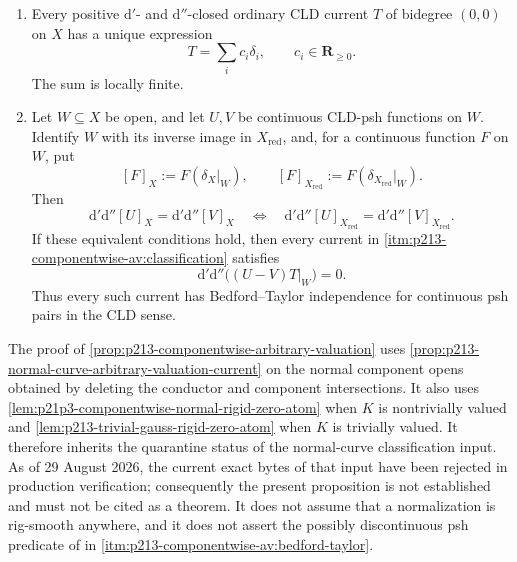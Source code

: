 \begin{proposition}
\begin{enumerate}
\item\label{itm:p213-componentwise-av:classification}
Every positive $\mathrm d'$- and $\mathrm d''$-closed ordinary CLD current
$T$ of bidegree $(0,0)$ on $X$ has a unique expression
\begin{equation}
 \label{eq:p213-componentwise-av-classification}
                         T=\sum_i c_i\delta_i,
                         \qquad c_i\in\mathbf R_{\geq0}.
\end{equation}
The sum is locally finite.

\item\label{itm:p213-componentwise-av:bedford-taylor}
Let $W\subseteq X$ be open, and let $U,V$ be continuous CLD-psh functions
on $W$.  Identify $W$ with its inverse image in $X_{\mathrm{red}}$, and,
for a continuous function $F$ on $W$, put
\[
 [F]_X:=F(\delta_X|_W),
 \qquad
 [F]_{X_{\mathrm{red}}}:=
      F(\delta_{X_{\mathrm{red}}}|_W).
\]
Then
\begin{equation}
 \label{eq:p213-componentwise-av-curvature-equivalence}
 \mathrm d'\mathrm d''[U]_X=\mathrm d'\mathrm d''[V]_X
 \quad\Longleftrightarrow\quad
 \mathrm d'\mathrm d''[U]_{X_{\mathrm{red}}}
  =\mathrm d'\mathrm d''[V]_{X_{\mathrm{red}}}.
\end{equation}
If these equivalent conditions hold, then every current in
\cref{itm:p213-componentwise-av:classification} satisfies
\begin{equation}
 \label{eq:p213-componentwise-av-bt-conclusion}
             \mathrm d'\mathrm d''\bigl((U-V)T|_W\bigr)=0.
\end{equation}
Thus every such current has Bedford--Taylor independence for continuous
psh pairs in the CLD sense.
\end{enumerate}
\end{proposition}

\begin{remark}
\label{rem:p213-componentwise-av-scope}
The proof of
\cref{prop:p213-componentwise-arbitrary-valuation} uses
\cref{prop:p213-normal-curve-arbitrary-valuation-current} on the normal
component opens obtained by deleting the conductor and component
intersections.  It also uses
\cref{lem:p21p3-componentwise-normal-rigid-zero-atom} when $K$ is
nontrivially valued and
\cref{lem:p213-trivial-gauss-rigid-zero-atom} when $K$ is trivially
valued.  It therefore inherits the quarantine status of the normal-curve
classification input.  As of 29 August 2026, the current exact bytes of
that input have been rejected in production verification; consequently the
present proposition is not established and must not be cited as a theorem.
It does not assume that a normalization is rig-smooth anywhere, and it
does not assert the possibly discontinuous psh predicate of
\cite[Definition~8.6.2]{CLD25} in
\cref{itm:p213-componentwise-av:bedford-taylor}.
\end{remark}

